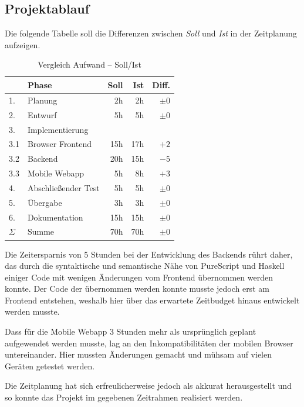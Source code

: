 \subsection{Projektablauf}
Die folgende Tabelle soll die Differenzen zwischen \textit{Soll} und \textit{Ist} in
der Zeitplanung aufzeigen.
\begin{table}[htb]
\centering
\begin{tabular}{l l r r r}
\toprule
   & Phase                & Soll & Ist & Diff. \\
\midrule
1. & Planung              & 2h  &  2h & $\pm0$ \\
2. & Entwurf              & 5h  &  5h & $\pm0$ \\
\midrule
3.  & Implementierung     &     &     &        \\
3.1 & Browser Frontend    & 15h & 17h & $  +2$ \\
3.2 & Backend             & 20h & 15h & $  -5$ \\
3.3 & Mobile Webapp       & 5h  &  8h & $  +3$ \\
\midrule
4. & Abschließender Test  &  5h &  5h & $\pm0$ \\
5. & Übergabe             &  3h &  3h & $\pm0$ \\
6. & Dokumentation        & 15h & 15h & $\pm0$ \\
\cmidrule{3-5}
$\Sigma$ & Summe          & 70h & 70h & $\pm0$ \\
\bottomrule
\end{tabular}
\caption{Vergleich Aufwand -- Soll/Ist}
\end{table}

\noindent Die Zeitersparnis von 5 Stunden bei der Entwicklung des
Backends rührt daher, das durch die syntaktische und semantische Nähe
von PureScript und Haskell einiger Code mit wenigen Änderungen vom
Frontend übernommen werden konnte. Der Code der übernommen werden
konnte musste jedoch erst am Frontend entstehen, weshalb hier über das
erwartete Zeitbudget hinaus entwickelt werden musste.

\noindent Dass für die Mobile Webapp 3 Stunden mehr als ursprünglich
geplant aufgewendet werden musste, lag an den Inkompatibilitäten der
mobilen Browser untereinander. Hier mussten Änderungen gemacht und
mühsam auf vielen Geräten getestet werden.

Die Zeitplanung hat sich erfreulicherweise jedoch als akkurat
herausgestellt und so konnte das Projekt im gegebenen Zeitrahmen
realisiert werden.

